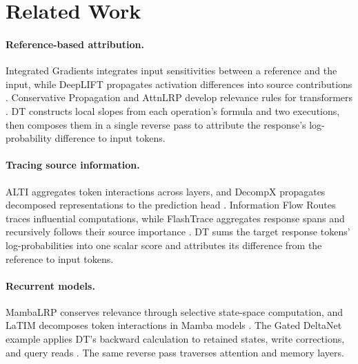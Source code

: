 \section{Related Work}

\paragraph{Reference-based attribution.}
Integrated Gradients integrates input sensitivities between a reference and the input, while DeepLIFT propagates activation differences into source contributions \citep{sundararajan2017axiomatic,shrikumar2017deeplift}. Conservative Propagation and AttnLRP develop relevance rules for transformers \citep{ali2022conservative,achtibat2024attnlrp}. DT constructs local slopes from each operation's formula and two executions, then composes them in a single reverse pass to attribute the response's log-probability difference to input tokens.

\paragraph{Tracing source information.}
ALTI aggregates token interactions across layers, and DecompX propagates decomposed representations to the prediction head \citep{ferrando2022alti,modarressi2023decompx}. Information Flow Routes traces influential computations, while FlashTrace aggregates response spans and recursively follows their source importance \citep{ferrando2024information,pan2026flashtrace}. DT sums the target response tokens' log-probabilities into one scalar score and attributes its difference from the reference to input tokens.

\paragraph{Recurrent models.}
MambaLRP conserves relevance through selective state-space computation, and LaTIM decomposes token interactions in Mamba models \citep{jafari2024mambalrp,pitorro2025latim}. The Gated DeltaNet example applies DT's backward calculation to retained states, write corrections, and query reads \citep{yang2024gated}. The same reverse pass traverses attention and memory layers.
